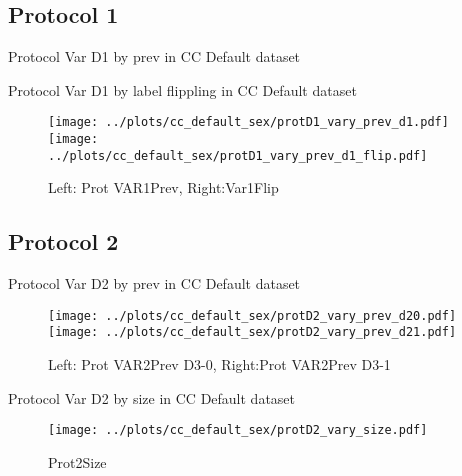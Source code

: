 \documentclass[10pt,a4paper]{article}
\begin{document}
\subsection{Protocol 1}

\begin{table}[h!]
\small

\caption{Protocol Var D1 by prev in CC Default dataset}
\end{table}

\begin{table}[h!]
\small

\caption{Protocol Var D1 by label flippling in CC Default dataset}
\end{table}

\begin{figure}[h!]
\texttt{[image: ../plots/cc\_default\_sex/protD1\_vary\_prev\_d1.pdf]}
\texttt{[image: ../plots/cc\_default\_sex/protD1\_vary\_prev\_d1\_flip.pdf]}
\caption{Left: Prot VAR1Prev, Right:Var1Flip}
\end{figure}

\clearpage
\newpage
\subsection{Protocol 2}

\begin{table}[h!]
\small

\caption{Protocol Var D2 by prev in CC Default dataset}
\end{table}

\begin{figure}[h!]
\texttt{[image: ../plots/cc\_default\_sex/protD2\_vary\_prev\_d20.pdf]}
\texttt{[image: ../plots/cc\_default\_sex/protD2\_vary\_prev\_d21.pdf]}
\caption{Left: Prot VAR2Prev D3-0, Right:Prot VAR2Prev D3-1}
\end{figure}

\begin{table}[h!]
\small

\caption{Protocol Var D2 by size in CC Default dataset}
\end{table}

\begin{figure}[h!]
\center
\texttt{[image: ../plots/cc\_default\_sex/protD2\_vary\_size.pdf]}
\caption{Prot2Size}
\end{figure}
\end{document}
